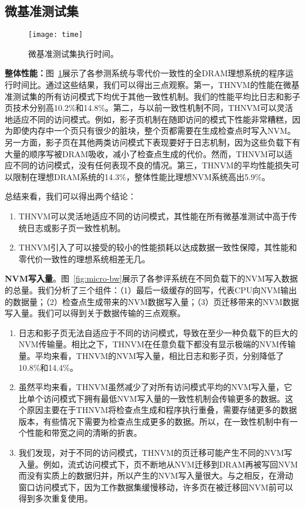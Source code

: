 \subsection{微基准测试集}

\begin{figure}[!h]
  \centering
  \texttt{[image: time]}
  \caption{微基准测试集执行时间。}
  \label{fig:micro-time}
\end{figure}

\textbf{整体性能：}图~\ref{fig:micro-time}展示了各参测系统与零代价一致性的全DRAM理想系统的程序运行时间比。通过这些结果，我们可以得出三点观察。第一，THNVM的性能在微基准测试集的所有访问模式下均优于其他一致性机制。我们的性能平均比日志和影子页技术分别高10.2\%和14.8\%。第二，与以前一致性机制不同，THNVM可以灵活地适应不同的访问模式。例如，影子页机制在随即访问的模式下性能非常糟糕，因为即使内存中一个页只有很少的脏块，整个页都需要在生成检查点时写入NVM。另一方面，影子页在其他两类访问模式下表现要好于日志机制，因为这些负载下有大量的顺序写被DRAM吸收，减小了检查点生成的代价。然而，THNVM可以适应不同的访问模式，没有任何表现不良的情况。第三，THNVM的平均性能损失可以限制在理想DRAM系统的14.3\%，整体性能比理想NVM系统高出5.9\%。

总结来看，我们可以得出两个结论：
\begin{enumerate}
\item THNVM可以灵活地适应不同的访问模式，其性能在所有微基准测试中高于传统日志或影子页一致性机制。 
\item THNVM引入了可以接受的较小的性能损耗以达成数据一致性保障，其性能和零代价一致性的理想系统相差无几。
\end{enumerate}

\textbf{NVM写入量}。图~\ref{fig:micro-bw}展示了各参评系统在不同负载下的NVM写入数据的总量。我们分析了三个组件：（1）最后一级缓存的回写，代表CPU向NVM输出的数据量；（2）检查点生成带来的NVM数据写入量；（3）页迁移带来的NVM数据写入量。我们可以得到关于数据传输的三点观察。
\begin{enumerate}
\item 日志和影子页无法自适应于不同的访问模式，导致在至少一种负载下的巨大的NVM传输量。相比之下，THNVM在任意负载下都没有显示极端的NVM传输量。平均来看，THNVM的NVM写入量，相比日志和影子页，分别降低了10.8\%和14.4\%。
\item 虽然平均来看，THNVM虽然减少了对所有访问模式平均的NVM写入量，它比单个访问模式下拥有最低NVM写入量的一致性机制会传输更多的数据。这个原因主要在于THNVM将检查点生成和程序执行重叠，需要存储更多的数据版本，有些情况下需要为检查点生成更多的数据。所以，在一致性机制中有一个性能和带宽之间的清晰的折衷。
\item 我们发现，对于不同的访问模式，THNVM的页迁移可能产生不同的NVM写入量。例如，流式访问模式下，页不断地从NVM迁移到DRAM再被写回NVM而没有实质上的数据归并，所以产生的NVM写入量很大。与之相反，在滑动窗口访问模式下，因为工作数据集缓慢移动，许多页在被迁移回NVM前可以得到多次重复使用。 
\end{enumerate}


